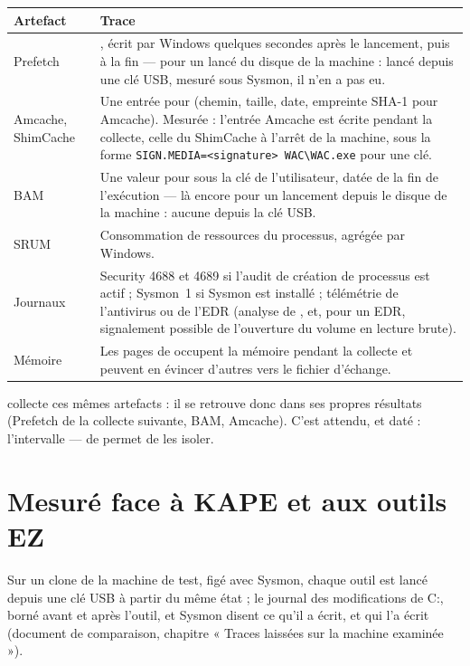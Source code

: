 \documentclass[11pt,a4paper,oneside]{report}
\begin{document}
\begin{longtable}{@{}L{4.3cm}L{10.1cm}@{}}
\toprule
\bfseries Artefact & \bfseries Trace \\
\midrule
\endhead
Prefetch & , écrit par Windows quelques secondes après le
  lancement, puis à la fin --- pour un  lancé du disque de la
  machine : lancé depuis une clé USB, mesuré sous Sysmon, il n'en a pas eu. \\
Amcache, ShimCache & Une entrée pour  (chemin, taille, date,
  empreinte SHA-1 pour Amcache). Mesurée : l'entrée Amcache est écrite pendant
  la collecte, celle du ShimCache à l'arrêt de la machine, sous la forme
  \texttt{SIGN.MEDIA=<signature> WAC\textbackslash WAC.exe} pour une clé. \\
BAM & Une valeur pour  sous la clé de l'utilisateur, datée de
  la fin de l'exécution --- là encore pour un lancement depuis le disque de la
  machine : aucune depuis la clé USB. \\
SRUM & Consommation de ressources du processus, agrégée par Windows. \\
Journaux & Security 4688 et 4689 si l'audit de création de processus est actif ;
  Sysmon~1 si Sysmon est installé ; télémétrie de l'antivirus ou de l'EDR
  (analyse de , et, pour un EDR, signalement possible de
  l'ouverture du volume en lecture brute). \\
Mémoire & Les pages de \wac{} occupent la mémoire pendant la collecte et
  peuvent en évincer d'autres vers le fichier d'échange. \\
\bottomrule
\end{longtable}

\begin{note}
\wac{} collecte ces mêmes artefacts : il se retrouve donc dans ses propres
résultats (Prefetch de la collecte suivante, BAM, Amcache). C'est attendu, et
daté : l'intervalle  ---  de
 permet de les isoler.
\end{note}

\section{Mesuré face à KAPE et aux outils EZ}

Sur un clone de la machine de test, figé avec Sysmon, chaque outil est lancé
depuis une clé USB à partir du même état ; le journal des modifications de C:,
borné avant et après l'outil, et Sysmon disent ce qu'il a écrit, et qui l'a
écrit (document de comparaison, chapitre « Traces laissées sur la machine
examinée »).
\end{document}
